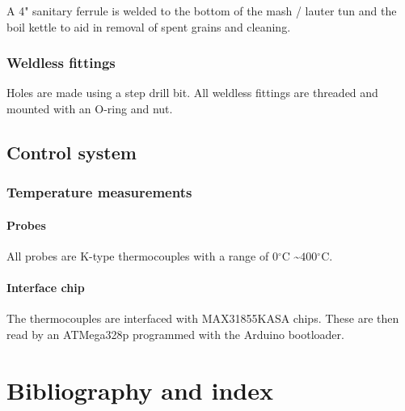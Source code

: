 \documentclass[11pt,fleqn]{book} %
\newcommand{\degree}{\ensuremath{^\circ}}
\begin{document}
A 4" sanitary ferrule is welded to the bottom of the mash / lauter tun and the boil kettle to aid in removal of spent grains and cleaning.

\section{Weldless fittings}

Holes are made using a step drill bit. All weldless fittings are threaded and mounted with an O-ring and nut.



\chapter{Control system}

\section{Temperature measurements}

\subsection{Probes}

All probes are K-type thermocouples with a range of $0\degree$C \textasciitilde $400\degree$C.

\subsection{Interface chip}

The thermocouples are interfaced with MAX31855KASA chips. These are then read by an ATMega328p programmed with the Arduino bootloader.


\part{Bibliography and index}

\end{document}
